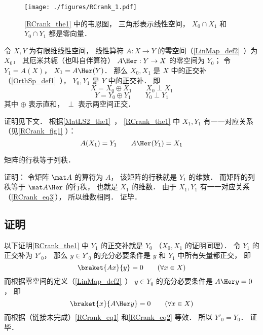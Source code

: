 

\begin{figure}[ht]
\centering
\texttt{[image: ./figures/RCrank\_1.pdf]}
\caption{\autoref{RCrank_the1} 中的韦恩图， 三角形表示线性空间， $X_0\cap X_1$ 和 $Y_0\cap  Y_1$ 都是零向量．} \label{RCrank_fig1}
\end{figure}

\begin{theorem}{}\label{RCrank_the1}
令 $X, Y$ 为有限维线性空间， 线性算符 $A:X \to Y$ 的零空间（\autoref{LinMap_def2}~）为 $X_0$， 其厄米共轭（也叫自伴算符） $A\Her: Y \to X$ 的零空间为 $Y_0$； 令 $Y_1 = A(X)$， $X_1 = A\Her(Y)$． 那么 $X_0, X_1$ 是 $X$ 中的正交补（\autoref{OrthSp_def1}~）， $Y_0, Y_1$ 是 $Y$ 中的正交补． 即
\begin{equation}
X = X_0 \oplus X_1 \qquad X_0 \perp X_1
\end{equation}
\begin{equation}
Y = Y_0 \oplus Y_1 \qquad Y_0 \perp Y_1
\end{equation}
其中 $\oplus$ 表示直和， $\perp$ 表示两空间正交．
\end{theorem}
证明见下文． 根据\autoref{MatLS2_the1}~， \autoref{RCrank_the1} 中 $X_1, Y_1$ 有一一对应关系（见\autoref{RCrank_fig1} ）：
\begin{equation}\label{RCrank_eq3}
A(X_1) = Y_1 \qquad A\Her (Y_1) = X_1
\end{equation}


\begin{corollary}{}
矩阵的行秩等于列秩．
\end{corollary}
证明： 令矩阵 $\mat A$ 的算符为 $A$， 该矩阵的行秩就是 $Y_1$ 的维数． 而矩阵的列秩等于 $\mat A\Her$ 的行秩， 也就是 $X_1$ 的维数． 由于 $X_1, Y_1$ 有一一对应关系（\autoref{RCrank_eq3}）， 所以维数相同． 证毕．

\subsection{证明}
以下证明\autoref{RCrank_the1} 中 $Y_1$ 的正交补就是 $Y_0$ （$X_0, X_1$ 的证明同理）． 令 $Y_1$ 的正交补为 $Y'_0$， 那么 $y \in Y'_0$ 的充分必要条件是 $y$ 和 $Y_1$ 中所有矢量都正交， 即
\begin{equation}\label{RCrank_eq1}
\braket{Ax}{y} = 0 \qquad (\forall x \in X)
\end{equation}
而根据零空间的定义（\autoref{LinMap_def2}~） $y \in Y_0$ 的充分必要条件是 $A\Her y = 0$， 即
\begin{equation}\label{RCrank_eq2}
\braket{x}{A\Her y} = 0 \qquad (\forall x \in X)
\end{equation}
而根据（链接未完成）\autoref{RCrank_eq1} 和\autoref{RCrank_eq2} 等效． 所以 $Y'_0 = Y_0$． 证毕．
